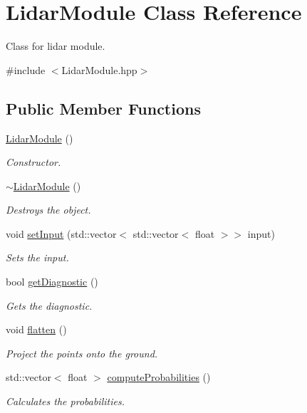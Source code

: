 \hypertarget{class_lidar_module}{}\section{Lidar\+Module Class Reference}
\label{class_lidar_module}


Class for lidar module.  




{\ttfamily \#include $<$Lidar\+Module.\+hpp$>$}

\subsection*{Public Member Functions}
\begin{DoxyCompactItemize}
\item 
\hyperlink{class_lidar_module_aaebef565e883b9254ab61d4ba45a19ec}{Lidar\+Module} ()
\begin{DoxyCompactList}\small\item\em Constructor. \end{DoxyCompactList}\item 
\hyperlink{class_lidar_module_a9f76d762ad58356a109e6ca68e9ab34c}{$\sim$\+Lidar\+Module} ()
\begin{DoxyCompactList}\small\item\em Destroys the object. \end{DoxyCompactList}\item 
void \hyperlink{class_lidar_module_a05318b0c70f04e9f7e9ec7896c3590cf}{set\+Input} (std\+::vector$<$ std\+::vector$<$ float $>$$>$ input)
\begin{DoxyCompactList}\small\item\em Sets the input. \end{DoxyCompactList}\item 
bool \hyperlink{class_lidar_module_a60f2786b71f6baa0756a2355eb1c908a}{get\+Diagnostic} ()
\begin{DoxyCompactList}\small\item\em Gets the diagnostic. \end{DoxyCompactList}\item 
void \hyperlink{class_lidar_module_a9e968b3f52665b2ec1aaae41122b4d0e}{flatten} ()
\begin{DoxyCompactList}\small\item\em Project the points onto the ground. \end{DoxyCompactList}\item 
std\+::vector$<$ float $>$ \hyperlink{class_lidar_module_aeb655e2c122dc36715f013b92689bda6}{compute\+Probabilities} ()
\begin{DoxyCompactList}\small\item\em Calculates the probabilities. \end{DoxyCompactList}\end{DoxyCompactItemize}


